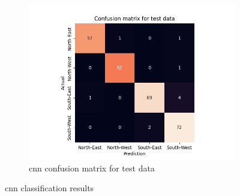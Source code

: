 \documentclass[10pt,twocolumn,letterpaper]{article}
\begin{document}
\begin{figure}
\begin{subfigure}{0.33\linewidth}
    \includegraphics[width=\linewidth, trim={7em, 0em, 9em, 5em}, clip]{cnn_cfsn_test}
    \caption{\acrshort{cnn} confusion matrix for test data}
    \label{fig:cnn_test}
  \end{subfigure}
  \caption{\acrlong{cnn} classification results}
  \label{fig:cnn_res}
\end{figure}
\end{document}
